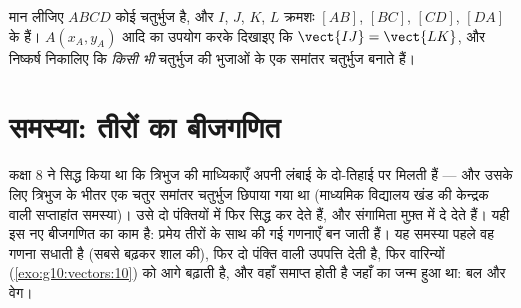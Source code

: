 \begin{exercise}[$\star\star\star$]\label{exo:g10:vectors:10}
मान लीजिए $ABCD$ कोई चतुर्भुज है, और $I$, $J$, $K$, $L$ क्रमशः
$[AB]$, $[BC]$, $[CD]$, $[DA]$ के  हैं।  $A(x_A, y_A)$ आदि का
उपयोग करके दिखाइए कि $\vect{IJ} = \vect{LK}$, और निष्कर्ष निकालिए कि \emph{किसी भी} चतुर्भुज
की भुजाओं के  एक समांतर चतुर्भुज बनाते हैं।
\end{exercise}

\section{समस्या: तीरों का बीजगणित}

\begin{problem}
\label{pb:g10:vectors:1}
कक्षा 8 ने सिद्ध किया था कि त्रिभुज की माध्यिकाएँ अपनी लंबाई के दो-तिहाई पर
मिलती हैं --- और उसके लिए त्रिभुज के भीतर एक चतुर समांतर चतुर्भुज छिपाया गया
था (माध्यमिक विद्यालय खंड की केन्द्रक वाली सप्ताहांत समस्या)।  उसे दो
पंक्तियों में फिर सिद्ध कर देते हैं, और संगामिता मुफ़्त में दे देते हैं। यही
इस नए बीजगणित का काम है: प्रमेय तीरों के साथ की गई गणनाएँ बन जाती हैं। यह
समस्या पहले वह गणना सधाती है (सबसे बढ़कर शाल की), फिर दो पंक्ति वाली उपपत्ति
देती है, फिर वारिन्यों (\cref{exo:g10:vectors:10}) को आगे बढ़ाती है, और वहाँ समाप्त होती है
जहाँ  का जन्म हुआ था: बल और वेग।


\end{problem}
